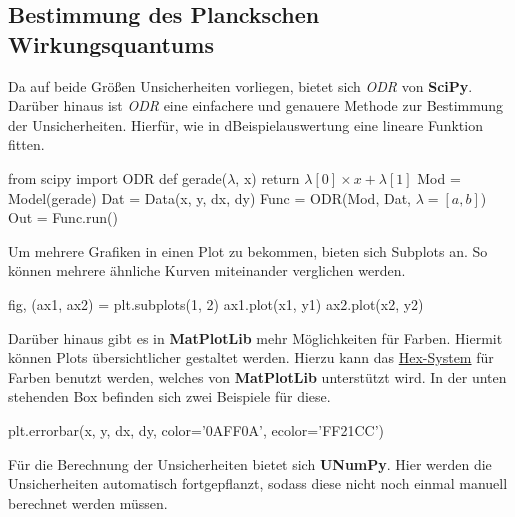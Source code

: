 \documentclass[a4paper,12pt]{article}
\begin{document}
\subsection{Bestimmung des Planckschen Wirkungsquantums}
Da auf beide Größen Unsicherheiten vorliegen, bietet sich \textit{ODR} von \textbf{SciPy}. Darüber hinaus ist \textit{ODR} eine einfachere und genauere Methode zur Bestimmung der Unsicherheiten. Hierfür, wie in dBeispielauswertung eine lineare Funktion fitten. \newline
\begin{center}
\begin{tcolorbox}[colback=gray!20, colframe=black, width=1\textwidth, boxrule=1pt, arc=1mm]
from scipy import ODR \newline
def gerade($\lambda$, x) \newline
\hspace*{1cm} return $\lambda[0] \times x + \lambda[1]$ \newline
Mod = Model(gerade) \newline
Dat = Data(x, y, dx, dy) \newline
Func = ODR(Mod, Dat, $\lambda=[a, b]$) \newline
Out = Func.run()
\end{tcolorbox}
\end{center}
Um mehrere Grafiken in einen Plot zu bekommen, bieten sich Subplots an. So können mehrere ähnliche Kurven miteinander verglichen werden. 
\begin{center}
\begin{tcolorbox}[colback=gray!20, colframe=black, width=1\textwidth, boxrule=1pt, arc=1mm]
fig, (ax1, ax2) = plt.subplots(1, 2) \newline
ax1.plot(x1, y1) \newline
ax2.plot(x2, y2)
\end{tcolorbox}
\end{center}
Darüber hinaus gibt es in \textbf{MatPlotLib} mehr Möglichkeiten für Farben. Hiermit können Plots übersichtlicher gestaltet werden. Hierzu kann das \href{https://www.rapidtables.org/de/web/color/html-color-codes.html}{Hex-System} für Farben benutzt werden, welches von \textbf{MatPlotLib} unterstützt wird. In der unten stehenden Box befinden sich zwei Beispiele für diese.
\begin{center}
\begin{tcolorbox}[colback=gray!20, colframe=black, width=1\textwidth, boxrule=1pt, arc=1mm]
plt.errorbar(x, y, dx, dy, color='0AFF0A', ecolor='FF21CC')
\end{tcolorbox}
\end{center}
Für die Berechnung der Unsicherheiten bietet sich \textbf{UNumPy}. Hier werden die Unsicherheiten automatisch  fortgepflanzt, sodass diese nicht noch einmal manuell berechnet werden müssen.
\end{document}
